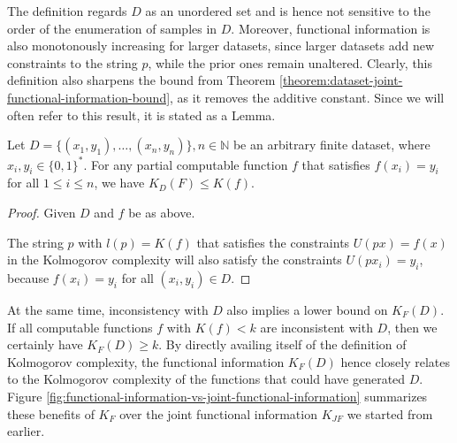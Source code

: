 The definition regards $D$ as an unordered set and is hence not sensitive to the order of the enumeration of samples in $D$.
Moreover, functional information is also monotonously increasing for larger datasets, since larger datasets add new constraints to the string $p$, while the prior ones remain unaltered.
Clearly, this definition also sharpens the bound from Theorem \ref{theorem:dataset-joint-functional-information-bound}, as it removes the additive constant. Since we will often refer to this result, it is stated as a Lemma.
\begin{lemma}
	\label{lemma:functional-information-bounded-by-generating-function}
	Let $D=\{(x_1,y_1),\dots,(x_n,y_n)\},n\in\mathbb{N}$ be an arbitrary finite dataset, where $x_i,y_i\in\{0,1\}^{*}$.
	For any partial computable function $f$ that satisfies $f(x_i)=y_i$ for all $1\leq i\leq n$, we have $K_D(F)\leq K(f)$.
\end{lemma}
\begin{proof}
	Given $D$ and $f$ be as above.
	
	The string $p$ with $l(p)=K(f)$ that satisfies the constraints $U(px)=f(x)$ in the Kolmogorov complexity will also satisfy the constraints $U(px_i)=y_i$, because $f(x_i)=y_i$ for all $(x_i,y_i)\in D$.
\end{proof}
At the same time, inconsistency with $D$ also implies a lower bound on $K_F(D)$.
If all computable functions $f$ with $K(f)<k$ are inconsistent with $D$, then we certainly have $K_F(D)\geq k$.
By directly availing itself of the definition of Kolmogorov complexity, the functional information $K_F(D)$ hence closely relates to the Kolmogorov complexity of the functions that could have generated $D$.
Figure \ref{fig:functional-information-vs-joint-functional-information} summarizes these benefits of $K_F$ over the joint functional information $K_{JF}$ we started from earlier.
